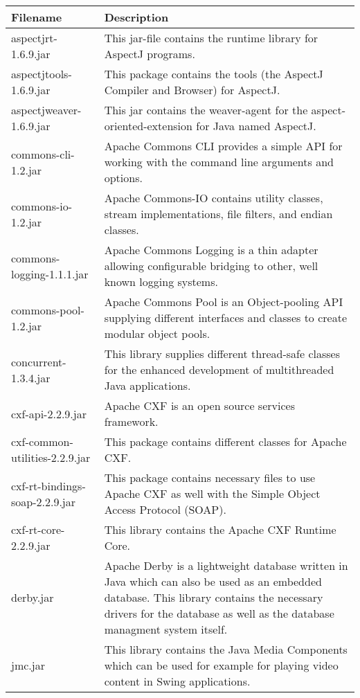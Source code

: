 \begin{center}
\begin{longtable}{|p{}|p{}|}
\hline 
Filename & Description\\
\hline
\hline 
aspectjrt-1.6.9.jar & This jar-file contains the runtime library for AspectJ programs.\\
\hline 
aspectjtools-1.6.9.jar & This package contains the tools (the AspectJ Compiler and Browser) for AspectJ.\\
\hline 
aspectjweaver-1.6.9.jar & This jar contains the weaver-agent for the aspect-oriented-extension for Java named AspectJ.\\
\hline 
commons-cli-1.2.jar & Apache Commons CLI provides a simple API for working with the command line arguments and options.\\
\hline 
commons-io-1.2.jar & Apache Commons-IO contains utility classes, stream implementations, file filters, and endian classes.\\
\hline 
commons-logging-1.1.1.jar & Apache Commons Logging is a thin adapter allowing configurable bridging to other, well known logging systems.\\
\hline 
commons-pool-1.2.jar & Apache Commons Pool is an Object-pooling API supplying different interfaces and classes to create modular object pools.\\
\hline 
concurrent-1.3.4.jar & This library supplies different thread-safe classes for the enhanced development of multithreaded Java applications.\\
\hline 
cxf-api-2.2.9.jar & Apache CXF is an open source services framework.  \\
\hline 
cxf-common-utilities-2.2.9.jar & This package contains different classes for Apache CXF.\\
\hline 
cxf-rt-bindings-soap-2.2.9.jar & This package contains necessary files to use Apache CXF as well with the Simple Object Access Protocol (SOAP).\\
\hline 
cxf-rt-core-2.2.9.jar & This library contains the Apache CXF Runtime Core. \\
\hline 
derby.jar & Apache Derby is a lightweight database written in Java which can also be used as an embedded database. This library contains the necessary drivers for the database as well as the database managment system itself.\\
\hline 
jmc.jar & This library contains the Java Media Components which can be used for example for playing video content in Swing applications.\\

\end{longtable}
\end{center}
